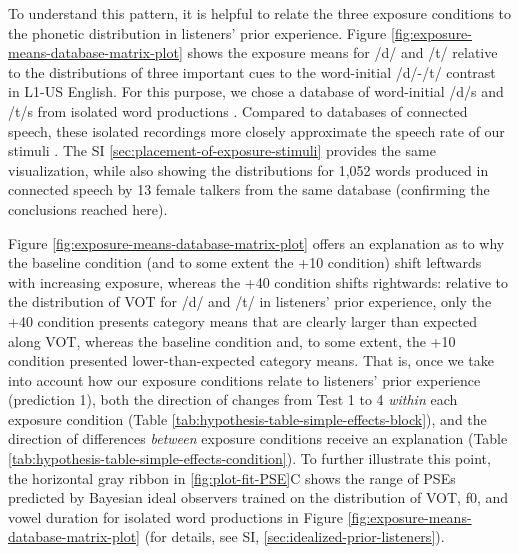 \documentclass[
  11pt,
  man,mask,floatsintext]{apa6}
\begin{document}
To understand this pattern, it is helpful to relate the three exposure conditions to the phonetic distribution in listeners' prior experience. Figure \ref{fig:exposure-means-database-matrix-plot} shows the exposure means for /d/ and /t/ relative to the distributions of three important cues to the word-initial /d/-/t/ contrast in L1-US English. For this purpose, we chose a database of word-initial /d/s and /t/s from isolated word productions \autocite{chodroff-wilson2018}. Compared to databases of connected speech, these isolated recordings more closely approximate the speech rate of our stimuli \autocites[which is known to affect the perception of VOT,][]{allen-miller1999,utman1998}. The SI \ref{sec:placement-of-exposure-stimuli} provides the same visualization, while also showing the distributions for 1,052 words produced in connected speech by 13 female talkers from the same database (confirming the conclusions reached here).

Figure \ref{fig:exposure-means-database-matrix-plot} offers an explanation as to why the baseline condition (and to some extent the +10 condition) shift leftwards with increasing exposure, whereas the +40 condition shifts rightwards: relative to the distribution of VOT for /d/ and /t/ in listeners' prior experience, only the +40 condition presents category means that are clearly larger than expected along VOT, whereas the baseline condition and, to some extent, the +10 condition presented lower-than-expected category means. That is, once we take into account how our exposure conditions relate to listeners' prior experience (prediction 1), both the direction of changes from Test 1 to 4 \emph{within} each exposure condition (Table \ref{tab:hypothesis-table-simple-effects-block}), and the direction of differences \emph{between} exposure conditions receive an explanation (Table \ref{tab:hypothesis-table-simple-effects-condition}). To further illustrate this point, the horizontal gray ribbon in \ref{fig:plot-fit-PSE}C shows the range of PSEs predicted by Bayesian ideal observers trained on the distribution of VOT, f0, and vowel duration for isolated word productions in Figure \ref{fig:exposure-means-database-matrix-plot} (for details, see SI, \ref{sec:idealized-prior-listeners}).
\end{document}
